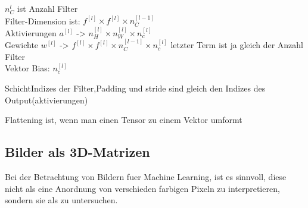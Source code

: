 $n_C^{l}$ ist Anzahl Filter\\

Filter-Dimension ist: $f^{[l]} \times f^{[l]} \times n_C^{[l-1]}$\\
Aktivierungen $a^{[l]}$ -> $n_H^{[l]} \times n_W^{[l]} \times n_c^{[l]}$\\
Gewichte $w^{[l]}$ -> $f^{[l]} \times f^{[l]} \times n_C^{[l-1]} \times
n_c^{[l]}$ letzter Term ist ja gleich der Anzahl Filter\\
Vektor Bias: $n_c^{[l]}$

SchichtIndizes der Filter,Padding und stride sind gleich den Indizes des Output(aktivierungen)


Flattening ist, wenn man einen Tensor zu einem Vektor umformt

\subsection{Bilder als 3D-Matrizen}
Bei der Betrachtung von Bildern fuer Machine Learning, ist es sinnvoll, diese
nicht als eine Anordnung von verschieden farbigen Pixeln zu interpretieren,
sondern sie als  zu untersuchen.


